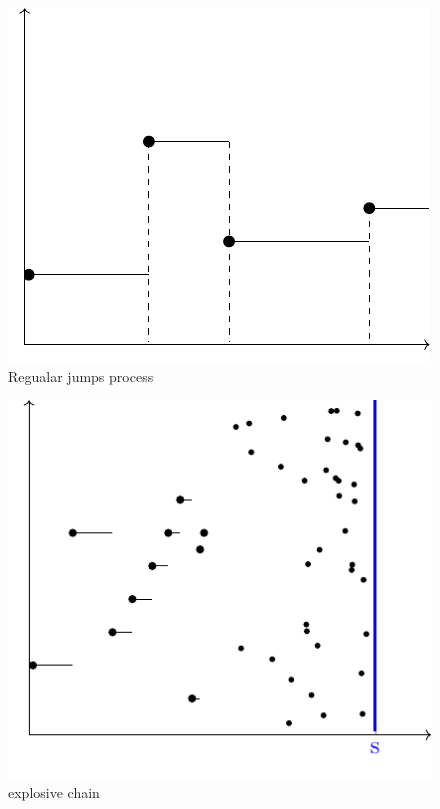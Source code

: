 \documentclass{article}
\begin{document}
	\begin{minipage}{0.5\textwidth}
		\begin{figure}[H]
			\centering
			\includegraphics[scale=0.6]{standalones/pdfs/regjump}
			\caption{Regualar jumps process}
			\label{regjump}
		\end{figure}
	\end{minipage} \hfill
	\begin{minipage}{0.45\textwidth}
		\begin{figure}[H]
			\centering
			\includegraphics[scale=0.6]{standalones/pdfs/xplosive}
			\caption{explosive chain}
			\label{xplchain}
		\end{figure}
	\end{minipage}
	
\end{document}
